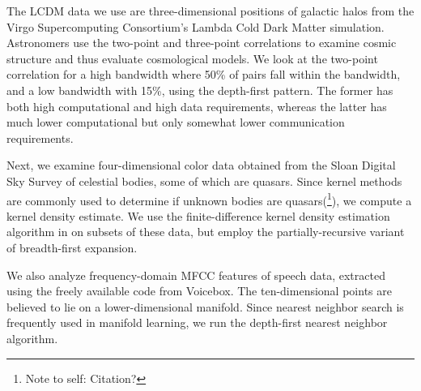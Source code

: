 \documentclass[twoside,leqno,twocolumn]{article}
\newcommand{\authornote}[1]{(\footnote{Note to self: #1})}
\newcommand{\authorsnote}[1]{\authornote{#1}}
\begin{document}
The LCDM data we use are three-dimensional positions of galactic halos from the Virgo Supercomputing Consortium's Lambda Cold Dark Matter simulation.
Astronomers use the two-point and three-point correlations to examine cosmic structure and thus evaluate cosmological models.
We look at the two-point correlation for a high bandwidth where 50\% of pairs fall within the bandwidth, and a low bandwidth with 15\%, using the depth-first pattern.
The former has both high computational and high data requirements, whereas the latter has much lower computational but only somewhat lower communication requirements.

Next, we examine four-dimensional color data obtained from the Sloan Digital Sky Survey of celestial bodies, some of which are quasars.
Since kernel methods are commonly used to determine if unknown bodies are quasars\authorsnote{Citation?}, we compute a kernel density estimate.
We use the finite-difference kernel density estimation algorithm in \cite{gray_kde} on subsets of these data, but employ the partially-recursive variant of breadth-first expansion.

We also analyze frequency-domain MFCC features of speech data, extracted using the freely available code from Voicebox.
The ten-dimensional points are believed to lie on a lower-dimensional manifold.
Since nearest neighbor search is frequently used in manifold learning, we run the depth-first nearest neighbor algorithm.

\end{document}
